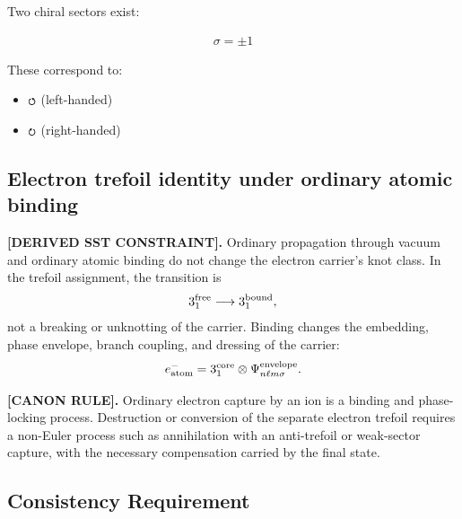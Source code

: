 \documentclass[11pt]{article}
\theoremstyle{definition}
\theoremstyle{plain}
\theoremstyle{remark}
\newcommand{\swirlarrow}{\mathchoice{\mkern-2mu\scriptstyle\boldsymbol{\circlearrowleft}}{\mkern-2mu\scriptstyle\boldsymbol{\circlearrowleft}}{\mkern-2mu\scriptscriptstyle\boldsymbol{\circlearrowleft}}{\mkern-2mu\scriptscriptstyle\boldsymbol{\circlearrowleft}}}
\newcommand{\swirlarrowcw}{\mathchoice{\mkern-2mu\scriptstyle\boldsymbol{\circlearrowright}}{\mkern-2mu\scriptstyle\boldsymbol{\circlearrowright}}{\mkern-2mu\scriptscriptstyle\boldsymbol{\circlearrowright}}{\mkern-2mu\scriptscriptstyle\boldsymbol{\circlearrowright}}}
\begin{document}
        Two chiral sectors exist:
        
        \begin{align}
            \sigma = \pm 1
        \end{align}
        
        These correspond to:
        
        \begin{itemize}
            \item $\swirlarrow$ (left-handed)
            \item $\swirlarrowcw$ (right-handed)
        \end{itemize}
    
    \subsection{Electron trefoil identity under ordinary atomic binding}
        \label{subsec:electron_trefoil_atomic_binding}

        \textbf{[DERIVED SST CONSTRAINT].}
        Ordinary propagation through vacuum and ordinary atomic binding do not
        change the electron carrier's knot class. In the trefoil assignment, the
        transition is
        \begin{align}
            3_1^{\rm free}
            \longrightarrow
            3_1^{\rm bound},
            \label{eq:free_to_bound_trefoil}
        \end{align}
        not a breaking or unknotting of the carrier. Binding changes the embedding,
        phase envelope, branch coupling, and dressing of the carrier:
        \begin{align}
            e^-_{\rm atom}
            =
            3_1^{\rm core}
            \otimes
            \Psi_{n\ell m\sigma}^{\rm envelope}.
            \label{eq:atomic_electron_trefoil_tensor_envelope}
        \end{align}

        \textbf{[CANON RULE].}
        Ordinary electron capture by an ion is a binding and phase-locking process.
        Destruction or conversion of the separate electron trefoil requires a
        non-Euler process such as annihilation with an anti-trefoil or weak-sector
        capture, with the necessary compensation carried by the final state.

    \subsection{Consistency Requirement}
        
\end{document}
